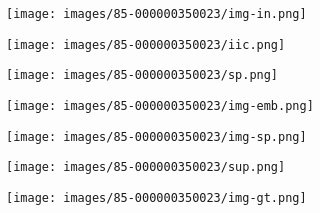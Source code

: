 \documentclass[letterpaper, 10 pt, journal, twoside]{IEEEtran}
\begin{document}
\begin{figure*}[htb]
    \par\smallskip
    \centering
    \begin{subfigure}[t]{0.125\textwidth}
      \texttt{[image: images/85-000000350023/img-in.png]}
    \end{subfigure}
    \begin{subfigure}[t]{0.125\textwidth}
      \texttt{[image: images/85-000000350023/iic.png]}
    \end{subfigure}
    \begin{subfigure}[t]{0.125\textwidth}
      \texttt{[image: images/85-000000350023/sp.png]}
    \end{subfigure}
    \begin{subfigure}[t]{0.125\textwidth}
      \texttt{[image: images/85-000000350023/img-emb.png]}
     \end{subfigure}
    \begin{subfigure}[t]{0.125\textwidth}
      \texttt{[image: images/85-000000350023/img-sp.png]}
    \end{subfigure}
    \begin{subfigure}[t]{0.125\textwidth}
      \texttt{[image: images/85-000000350023/sup.png]}
    \end{subfigure}
    \begin{subfigure}[t]{0.125\textwidth}
      \texttt{[image: images/85-000000350023/img-gt.png]}
    \end{subfigure} 
    

\end{figure*}
\end{document}
